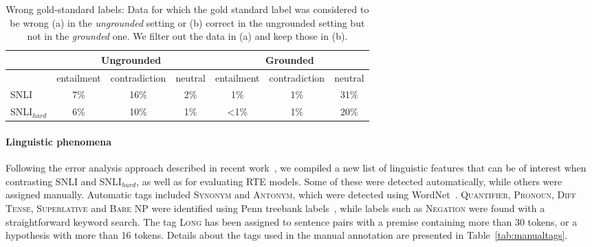 \documentclass[11pt]{article}
\begin{document}
\begin{table}
    \small
    \begin{center}
        \begin{tabular}{|l|ccc|ccc|}
        	\hline
            & \multicolumn{3}{|c}{Ungrounded} & \multicolumn{3}{|c|}{Grounded}\\\hline
            & entailment & contradiction & neutral & entailment & contradiction & neutral\\\hline
            SNLI & 7\% & 16\% & 2\% & 1\% & 1\% & 31\% \\
            SNLI$_{hard}$ & 6\% & 10\% & 1\% & \textless1\% & 1\% & 20\%\\\hline
        \end{tabular}
        \caption{Wrong gold-standard labels: Data for which the gold standard label was considered to be wrong (a) in the \emph{ungrounded} setting or (b) correct in the ungrounded setting but not in the \emph{grounded} one. We filter out the data in (a) and keep those in (b). }\label{tab:changedlabels}
    \end{center}
\end{table}

\paragraph{Linguistic phenomena}
Following the error analysis approach described
in recent work~\cite{Nangia2017,Williams2018}, we compiled a new list
of linguistic features that can be of interest when contrasting SNLI
and SNLI$_{hard}$, as well as for evaluating RTE models. Some of these
were detected automatically, while others were assigned manually. Automatic tags included \textsc{Synonym} and \textsc{Antonym}, which were detected using WordNet~\cite{Miller1995}.
 \textsc{Quantifier}, \textsc{Pronoun}, \textsc{Diff Tense}, \textsc{Superlative} and \textsc{Bare NP} were identified using Penn treebank labels~\cite{Marcus1993}, while labels such as \textsc{Negation} were found with a straightforward keyword search.
The tag \textsc{Long} has been assigned to sentence pairs with a premise containing more than 30 tokens,
or a hypothesis with more than 16 tokens.
Details about the tags used in the manual annotation are presented in Table~\ref{tab:manualtags}.
\end{document}
